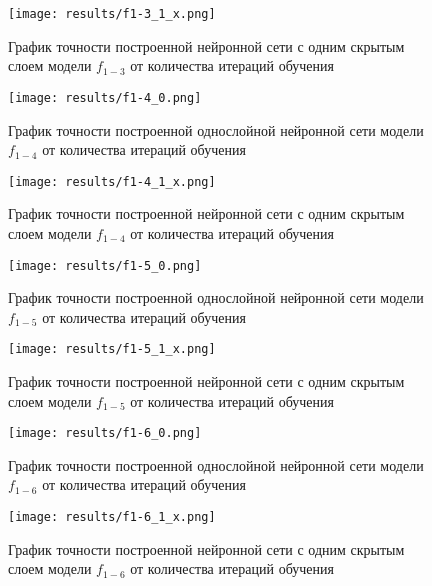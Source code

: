   \begin{figure}[H]
  	\texttt{[image: results/f1-3\_1\_x.png]}
  	
  	\caption{График точности построенной нейронной сети с одним скрытым слоем модели $f_{1-3}$  от количества итераций обучения}
  \end{figure}
  
      \begin{figure}[H]
  	\texttt{[image: results/f1-4\_0.png]}
  	
  	\caption{График точности построенной однослойной нейронной сети модели $f_{1-4}$ от количества итераций обучения}
  	
  \end{figure}
  
  \begin{figure}[H]
  	\texttt{[image: results/f1-4\_1\_x.png]}
  	
  	\caption{График точности построенной нейронной сети с одним скрытым слоем модели $f_{1-4}$  от количества итераций обучения}
  \end{figure}
  
      \begin{figure}[H]
  	\texttt{[image: results/f1-5\_0.png]}
  	
  	\caption{График точности построенной однослойной нейронной сети модели $f_{1-5}$ от количества итераций обучения}
  	
  \end{figure}
  
  \begin{figure}[H]
  	\texttt{[image: results/f1-5\_1\_x.png]}
  	
  	\caption{График точности построенной нейронной сети с одним скрытым слоем модели $f_{1-5}$  от количества итераций обучения}
  \end{figure}
  
      \begin{figure}[H]
  	\texttt{[image: results/f1-6\_0.png]}
  	
  	\caption{График точности построенной однослойной нейронной сети модели $f_{1-6}$ от количества итераций обучения}
  	
  \end{figure}
  
  \begin{figure}[H]
  	\texttt{[image: results/f1-6\_1\_x.png]}
  	
  	\caption{График точности построенной нейронной сети с одним скрытым слоем модели $f_{1-6}$  от количества итераций обучения}
  \end{figure}
  
